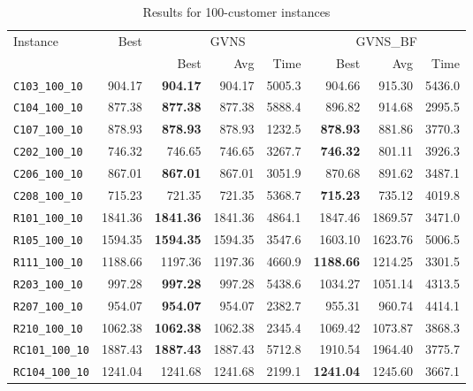 \begin{table}[ht]
\centering
\small
\setlength{\tabcolsep}{5pt}
\caption{Results for 100-customer instances}
\vspace{4mm}
\begin{adjustbox}{width=\textwidth}
\begin{tabular}{l r r r r @{\hspace{8pt}} r r r @{\hspace{8pt}}}
\toprule
\multirow{2}{*}{Instance} & \multirow{2}{*}{Best} & \multicolumn{3}{c}{GVNS} & \multicolumn{3}{c}{GVNS\_BF} \\
\cmidrule(lr){3-5} \cmidrule(lr){6-8}
 &  & Best & Avg & Time & Best & Avg & Time \\
\midrule
\texttt{C103\_100\_10} & 904.17 & \textbf{904.17} & 904.17 & 5005.3 & 904.66 & 915.30 & 5436.0 \\
\texttt{C104\_100\_10} & 877.38 & \textbf{877.38} & 877.38 & 5888.4 & 896.82 & 914.68 & 2995.5 \\
\texttt{C107\_100\_10} & 878.93 & \textbf{878.93} & 878.93 & 1232.5 & \textbf{878.93} & 881.86 & 3770.3 \\
\texttt{C202\_100\_10} & 746.32 & 746.65 & 746.65 & 3267.7 & \textbf{746.32} & 801.11 & 3926.3 \\
\texttt{C206\_100\_10} & 867.01 & \textbf{867.01} & 867.01 & 3051.9 & 870.68 & 891.62 & 3487.1 \\
\texttt{C208\_100\_10} & 715.23 & 721.35 & 721.35 & 5368.7 & \textbf{715.23} & 735.12 & 4019.8 \\
\texttt{R101\_100\_10} & 1841.36 & \textbf{1841.36} & 1841.36 & 4864.1 & 1847.46 & 1869.57 & 3471.0 \\
\texttt{R105\_100\_10} & 1594.35 & \textbf{1594.35} & 1594.35 & 3547.6 & 1603.10 & 1623.76 & 5006.5 \\
\texttt{R111\_100\_10} & 1188.66 & 1197.36 & 1197.36 & 4660.9 & \textbf{1188.66} & 1214.25 & 3301.5 \\
\texttt{R203\_100\_10} & 997.28 & \textbf{997.28} & 997.28 & 5438.6 & 1034.27 & 1051.14 & 4313.5 \\
\texttt{R207\_100\_10} & 954.07 & \textbf{954.07} & 954.07 & 2382.7 & 955.31 & 960.74 & 4414.1 \\
\texttt{R210\_100\_10} & 1062.38 & \textbf{1062.38} & 1062.38 & 2345.4 & 1069.42 & 1073.87 & 3868.3 \\
\texttt{RC101\_100\_10} & 1887.43 & \textbf{1887.43} & 1887.43 & 5712.8 & 1910.54 & 1964.40 & 3775.7 \\
\texttt{RC104\_100\_10} & 1241.04 & 1241.68 & 1241.68 & 2199.1 & \textbf{1241.04} & 1245.60 & 3667.1 \\

\end{tabular}
\end{adjustbox}
\end{table}
